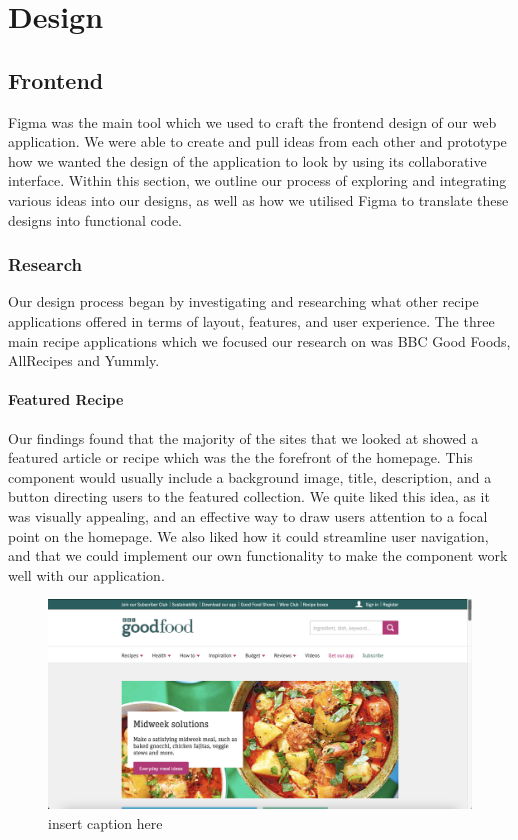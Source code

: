 \documentclass{article}
\begin{document}
\section{Design}
\subsection{Frontend}
Figma was the main tool which we used to craft the frontend design of our web application. We were able to create and pull ideas from each other and prototype how we wanted the design of the application to look by using its collaborative interface. Within this section, we outline our process of exploring and integrating various ideas into our designs, as well as how we utilised Figma to translate these designs into functional code.

\subsubsection{Research}

Our design process began by investigating and researching what other recipe applications offered in terms of layout, features, and user experience. The three main recipe applications which we focused our research on was BBC Good Foods, AllRecipes and Yummly.

\paragraph{Featured Recipe}
Our findings found that the majority of the sites that we looked at showed a featured article or recipe which was the the forefront of the homepage. This component would usually include a background image, title, description, and a button directing users to the featured collection. We quite liked this idea, as it was visually appealing, and an effective way to draw users attention to a focal point on the homepage. We also liked how it could streamline user navigation, and that we could implement our own functionality to make the component work well with our application.

\begin{figure}[htbp]
  \includegraphics[width=1.0\textwidth]{assets/BBCGF featured-image.png}
  \centering
  \caption{insert caption here}
\end{figure}
\end{document}
